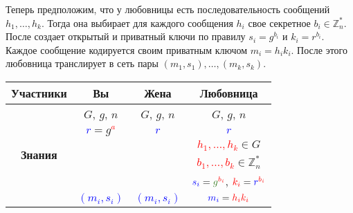 Теперь предположим, что у любовницы есть последовательность сообщений $h_1,\ldots, h_k$. Тогда она выбирает для каждого сообщения $h_i$ свое секретное $b_i\in\mathbb Z_n^*$. После создает открытый и приватный ключи по правилу $s_i = g^{b_i}$ и $k_i = r^{b_i}$. Каждое сообщение кодируется своим приватным ключом $m_i = h_i k_i$. После этого любовница транслирует в сеть пары $(m_1, s_1),\ldots,(m_k, s_k)$.
\begin{center}
\begin{tabular}{|c|c|c|c|}
\hline
{\bf Участники}&{Вы}&{Жена}&{Любовница}\\
\hline
\multirow{6}{*}{\bf Знания}&{\textcolor{OliveGreen}{$G$}, \textcolor{OliveGreen}{$g$}, \textcolor{OliveGreen}{$n$}}&{\textcolor{OliveGreen}{$G$}, \textcolor{OliveGreen}{$g$}, \textcolor{OliveGreen}{$n$}}&{\textcolor{OliveGreen}{$G$}, \textcolor{OliveGreen}{$g$}, \textcolor{OliveGreen}{$n$}}\\
{}&{ \textcolor{blue}{$r$}$=$\textcolor{OliveGreen}{$ g$}\textcolor{red}{${}^a$}}&{\textcolor{blue}{$r$}}&{\textcolor{blue}{$r$}}\\
{}&{}&{}&{\textcolor{red}{$h_1,\ldots,h_k$}$\in G$}\\
{}&{}&{}&{\textcolor{red}{$b_1,\ldots,b_k$}$\in \mathbb Z_n^*$}\\
{}&{}&{}&{$\textcolor{blue}{s_i} = \textcolor{OliveGreen}{g}^{\textcolor{red}{b_i}}$, $\textcolor{red}{k_i} = \textcolor{blue}{r}^{\textcolor{red}{b_i}}$}\\
{}&{\textcolor{blue}{$(m_i, s_i)$}}&{\textcolor{blue}{$(m_i, s_i)$}}&{$\textcolor{blue}{m_i} = \textcolor{red}{h_i k_i}$}\\
\hline
\end{tabular}
\end{center}

